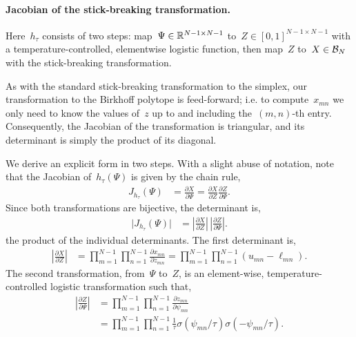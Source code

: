 \paragraph{Jacobian of the stick-breaking transformation.}
Here~$h_\tau$ consists of two steps:
map~${\Psi \in \mathbb{R}^{N-1 \times N-1}}$
to~$Z \in [0,1]^{N-1 \times N-1}$ with a temperature-controlled,
elementwise logistic function, then map~$Z$ to~$X \in \mathcal{B}_N$ with the
stick-breaking transformation.

As with the standard stick-breaking transformation to the simplex,
our transformation to the Birkhoff polytope is feed-forward;
i.e. to compute~$x_{mn}$ we only need to know the values of~$z$
up to and including the~$(m,n)$-th entry. Consequently, the
Jacobian of the transformation is triangular, and its determinant
is simply the product of its diagonal.

We derive an explicit form in two steps. With a slight abuse of
notation, note that the Jacobian of~$h_\tau(\Psi)$ is given
by the chain rule,
\begin{align*}
  J_{h_\tau}(\Psi)
  &= \frac{\partial X}{\partial  \Psi}
    = \frac{\partial X}{\partial Z} \frac{\partial Z}{\partial \Psi}.
\end{align*}
Since both transformations are bijective, the determinant is,
\begin{align*}
  \big| J_{h_\tau}(\Psi) \big|
  &= \left| \frac{\partial X}{\partial Z} \right| \,
     \left| \frac{\partial Z}{\partial \Psi} \right|.
\end{align*}
the product
of the individual determinants.  The first determinant is,
\begin{align*}
  \left| \frac{\partial X}{\partial Z} \right|
  &= \prod_{m=1}^{N-1} \prod_{n=1}^{N-1} \frac{\partial x_{mn} }{\partial {z}_{mn}} 
  = \prod_{m=1}^{N-1} \prod_{n=1}^{N-1} (u_{mn} - \ell_{mn}).
\end{align*}
The second transformation, from~$\Psi$ to~$Z$, is an element-wise,
temperature-controlled logistic transformation such that,
\begin{align*}
  \left| \frac{\partial Z}{\partial \Psi} \right| 
  &= \prod_{m=1}^{N-1} \prod_{n=1}^{N-1} \frac{\partial z_{mn}}{\partial \psi_{mn}} \\
  &= \prod_{m=1}^{N-1} \prod_{n=1}^{N-1}
    \frac{1}{\tau} \sigma \left(\psi_{mn} / \tau \right)
    \sigma \left(-\psi_{mn} / \tau \right).
\end{align*}


